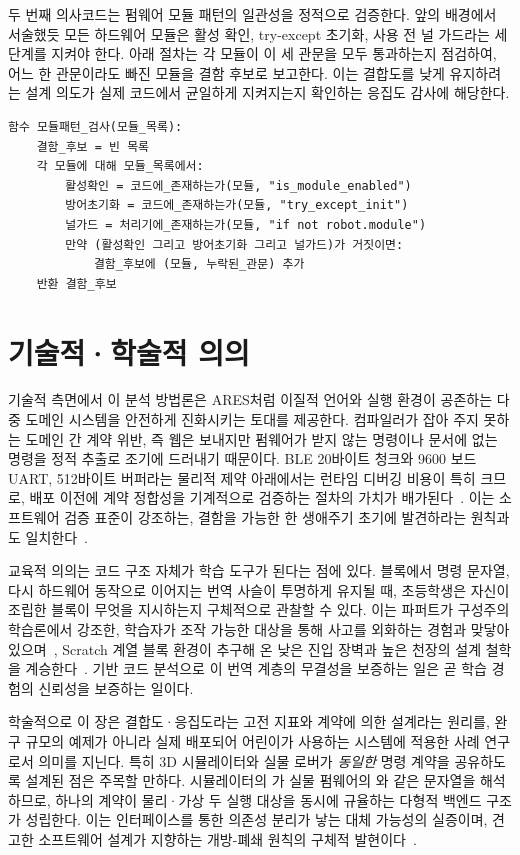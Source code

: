 두 번째 의사코드는 펌웨어 모듈 패턴의 일관성을 정적으로 검증한다. 앞의 배경에서 서술했듯 모든 하드웨어 모듈은 활성 확인, try-except 초기화, 사용 전 널 가드라는 세 단계를 지켜야 한다. 아래 절차는 각 모듈이 이 세 관문을 모두 통과하는지 점검하여, 어느 한 관문이라도 빠진 모듈을 결함 후보로 보고한다. 이는 결합도를 낮게 유지하려는 설계 의도가 실제 코드에서 균일하게 지켜지는지 확인하는 응집도 감사에 해당한다.

\begin{verbatim}
함수 모듈패턴_검사(모듈_목록):
    결함_후보 = 빈 목록
    각 모듈에 대해 모듈_목록에서:
        활성확인 = 코드에_존재하는가(모듈, "is_module_enabled")
        방어초기화 = 코드에_존재하는가(모듈, "try_except_init")
        널가드 = 처리기에_존재하는가(모듈, "if not robot.module")
        만약 (활성확인 그리고 방어초기화 그리고 널가드)가 거짓이면:
            결함_후보에 (모듈, 누락된_관문) 추가
    반환 결함_후보
\end{verbatim}

\section{기술적·학술적 의의}

기술적 측면에서 이 분석 방법론은 ARES처럼 이질적 언어와 실행 환경이 공존하는 다중 도메인 시스템을 안전하게 진화시키는 토대를 제공한다. 컴파일러가 잡아 주지 못하는 도메인 간 계약 위반, 즉 웹은 보내지만 펌웨어가 받지 않는 명령이나 문서에 없는 명령을 정적 추출로 조기에 드러내기 때문이다. BLE 20바이트 청크와 9600 보드 UART, 512바이트 버퍼라는 물리적 제약 아래에서는 런타임 디버깅 비용이 특히 크므로, 배포 이전에 계약 정합성을 기계적으로 검증하는 절차의 가치가 배가된다~\cite{micropython, webbluetooth}. 이는 소프트웨어 검증 표준이 강조하는, 결함을 가능한 한 생애주기 초기에 발견하라는 원칙과도 일치한다~\cite{iso29119}.

교육적 의의는 코드 구조 자체가 학습 도구가 된다는 점에 있다. 블록에서 명령 문자열, 다시 하드웨어 동작으로 이어지는 번역 사슬이 투명하게 유지될 때, 초등학생은 자신이 조립한 블록이 무엇을 지시하는지 구체적으로 관찰할 수 있다. 이는 파퍼트가 구성주의 학습론에서 강조한, 학습자가 조작 가능한 대상을 통해 사고를 외화하는 경험과 맞닿아 있으며~\cite{papert1980}, Scratch 계열 블록 환경이 추구해 온 낮은 진입 장벽과 높은 천장의 설계 철학을 계승한다~\cite{resnick2009scratch, maloney2010scratch}. 기반 코드 분석으로 이 번역 계층의 무결성을 보증하는 일은 곧 학습 경험의 신뢰성을 보증하는 일이다.

학술적으로 이 장은 결합도·응집도라는 고전 지표와 계약에 의한 설계라는 원리를, 완구 규모의 예제가 아니라 실제 배포되어 어린이가 사용하는 시스템에 적용한 사례 연구로서 의미를 지닌다. 특히 3D 시뮬레이터와 실물 로버가 \emph{동일한} 명령 계약을 공유하도록 설계된 점은 주목할 만하다. 시뮬레이터의 가 실물 펌웨어의 와 같은 문자열을 해석하므로, 하나의 계약이 물리·가상 두 실행 대상을 동시에 규율하는 다형적 백엔드 구조가 성립한다. 이는 인터페이스를 통한 의존성 분리가 낳는 대체 가능성의 실증이며, 견고한 소프트웨어 설계가 지향하는 개방-폐쇄 원칙의 구체적 발현이다~\cite{martin2008cleancode, fowler2018refactoring}.

